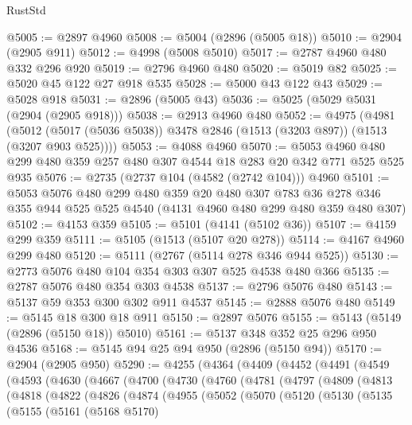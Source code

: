 \begin{lexlean}{RustStd}
\begin{coremodule}
@5005 := @2897 @4960
@5008 := @5004 (@2896 (@5005 @18))
@5010 := @2904 (@2905 @911)
@5012 := @4998 (@5008 @5010)
@5017 := @2787 @4960 @480 @332 @296 @920
@5019 := @2796 @4960 @480
@5020 := @5019 @82
@5025 := @5020 @45 @122 @27 @918 @535
@5028 := @5000 @43 @122 @43
@5029 := @5028 @918
@5031 := @2896 (@5005 @43)
@5036 := @5025 (@5029 @5031 (@2904 (@2905 @918)))
@5038 := @2913 @4960 @480
@5052 := @4975
    (@4981 (@5012 (@5017 (@5036 @5038)) @3478 @2846 (@1513 (@3203 @897)) (@1513 (@3207 @903 @525))))
@5053 := @4088 @4960
@5070 := @5053 @4960 @480 @299 @480 @359 @257 @480 @307 @4544 @18 @283 @20 @342 @771 @525 @525 @935
@5076 := @2735 (@2737 @104 (@4582 (@2742 @104))) @4960
@5101 := @5053
    @5076
    @480
    @299
    @480
    @359
    @20
    @480
    @307
    @783
    @36
    @278
    @346
    @355
    @944
    @525
    @525
    @4540
    (@4131 @4960 @480 @299 @480 @359 @480 @307)
@5102 := @4153 @359
@5105 := @5101 (@4141 (@5102 @36))
@5107 := @4159 @299 @359
@5111 := @5105 (@1513 (@5107 @20 @278))
@5114 := @4167 @4960 @299 @480
@5120 := @5111 (@2767 (@5114 @278 @346 @944 @525))
@5130 := @2773 @5076 @480 @104 @354 @303 @307 @525 @4538 @480 @366
@5135 := @2787 @5076 @480 @354 @303 @4538
@5137 := @2796 @5076 @480
@5143 := @5137 @59 @353 @300 @302 @911 @4537
@5145 := @2888 @5076 @480
@5149 := @5145 @18 @300 @18 @911
@5150 := @2897 @5076
@5155 := @5143 (@5149 (@2896 (@5150 @18)) @5010)
@5161 := @5137 @348 @352 @25 @296 @950 @4536
@5168 := @5145 @94 @25 @94 @950 (@2896 (@5150 @94))
@5170 := @2904 (@2905 @950)
@5290 := @4255
    (@4364
      (@4409
        (@4452
          (@4491
            (@4549
              (@4593
                (@4630
                  (@4667
                    (@4700
                      (@4730
                        (@4760
                          (@4781
                            (@4797
                              (@4809
                                (@4813
                                  (@4818
                                    (@4822
                                      (@4826
                                        (@4874
                                          (@4955
                                            (@5052
                                              (@5070
                                                (@5120
                                                  (@5130
                                                    (@5135
                                                      (@5155
                                                        (@5161
                                                          (@5168 @5170)

\end{coremodule}
\end{lexlean}
